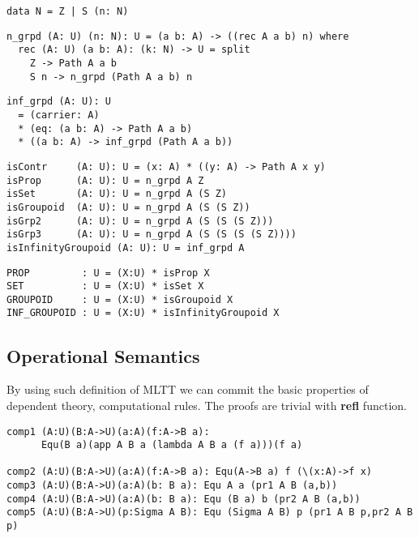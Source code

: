 \documentclass{article}
\begin{document}
\begin{lstlisting}[mathescape=true]
data N = Z | S (n: N)
\end{lstlisting}

\begin{lstlisting}[mathescape=true]
n_grpd (A: U) (n: N): U = (a b: A) -> ((rec A a b) n) where
  rec (A: U) (a b: A): (k: N) -> U = split
    Z -> Path A a b
    S n -> n_grpd (Path A a b) n
\end{lstlisting}

\begin{lstlisting}
inf_grpd (A: U): U
  = (carrier: A)
  * (eq: (a b: A) -> Path A a b)
  * ((a b: A) -> inf_grpd (Path A a b))
\end{lstlisting}

\begin{lstlisting}[mathescape=true]
isContr     (A: U): U = (x: A) * ((y: A) -> Path A x y)
isProp      (A: U): U = n_grpd A Z
isSet       (A: U): U = n_grpd A (S Z)
isGroupoid  (A: U): U = n_grpd A (S (S Z))
isGrp2      (A: U): U = n_grpd A (S (S (S Z)))
isGrp3      (A: U): U = n_grpd A (S (S (S (S Z))))
isInfinityGroupoid (A: U): U = inf_grpd A
\end{lstlisting}

\begin{lstlisting}[mathescape=true]
PROP         : U = (X:U) * isProp X
SET          : U = (X:U) * isSet X
GROUPOID     : U = (X:U) * isGroupoid X
INF_GROUPOID : U = (X:U) * isInfinityGroupoid X
\end{lstlisting}

\subsection{Operational Semantics}

By using such definition of MLTT we can commit the basic properties
of dependent theory, computational rules. The proofs are trivial
with {\bf refl} function.

\begin{lstlisting}[mathescape=true]
comp1 (A:U)(B:A->U)(a:A)(f:A->B a):
      Equ(B a)(app A B a (lambda A B a (f a)))(f a)

comp2 (A:U)(B:A->U)(a:A)(f:A->B a): Equ(A->B a) f (\(x:A)->f x)
comp3 (A:U)(B:A->U)(a:A)(b: B a): Equ A a (pr1 A B (a,b))
comp4 (A:U)(B:A->U)(a:A)(b: B a): Equ (B a) b (pr2 A B (a,b))
comp5 (A:U)(B:A->U)(p:Sigma A B): Equ (Sigma A B) p (pr1 A B p,pr2 A B p)
\end{lstlisting}
\end{document}
